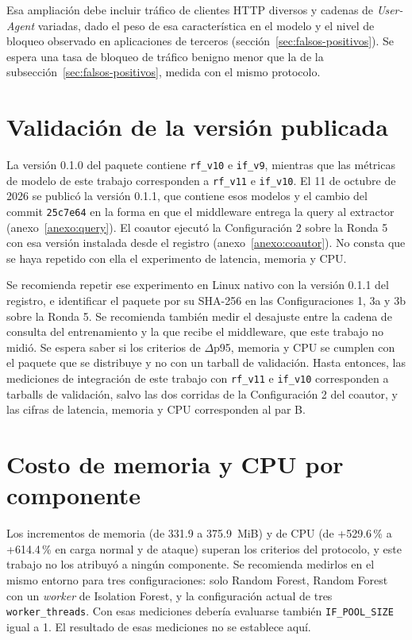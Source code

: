Esa ampliación debe incluir tráfico de clientes HTTP diversos y cadenas de \textit{User-Agent} variadas, dado el peso de esa característica en el modelo y el nivel de bloqueo observado en aplicaciones de terceros (sección~\ref{sec:falsos-positivos}). Se espera una tasa de bloqueo de tráfico benigno menor que la de la subsección~\ref{sec:falsos-positivos}, medida con el mismo protocolo.

\section{Validación de la versión publicada}

La versión 0.1.0 del paquete contiene \texttt{rf\_v10} e \texttt{if\_v9}, mientras que las métricas de modelo de este trabajo corresponden a \texttt{rf\_v11} e \texttt{if\_v10}. El 11 de octubre de 2026 se publicó la versión 0.1.1, que contiene esos modelos y el cambio del commit \texttt{25c7e64} en la forma en que el middleware entrega la query al extractor (anexo~\ref{anexo:query}). El coautor ejecutó la Configuración 2 sobre la Ronda 5 con esa versión instalada desde el registro (anexo~\ref{anexo:coautor}). No consta que se haya repetido con ella el experimento de latencia, memoria y CPU.

Se recomienda repetir ese experimento en Linux nativo con la versión 0.1.1 del registro, e identificar el paquete por su SHA-256 en las Configuraciones 1, 3a y 3b sobre la Ronda 5. Se recomienda también medir el desajuste entre la cadena de consulta del entrenamiento y la que recibe el middleware, que este trabajo no midió. Se espera saber si los criterios de $\Delta$p95, memoria y CPU se cumplen con el paquete que se distribuye y no con un tarball de validación. Hasta entonces, las mediciones de integración de este trabajo con \texttt{rf\_v11} e \texttt{if\_v10} corresponden a tarballs de validación, salvo las dos corridas de la Configuración 2 del coautor, y las cifras de latencia, memoria y CPU corresponden al par B.

\section{Costo de memoria y CPU por componente}

Los incrementos de memoria (de 331.9 a 375.9~MiB) y de CPU (de +529.6\,\% a +614.4\,\% en carga normal y de ataque) superan los criterios del protocolo, y este trabajo no los atribuyó a ningún componente. Se recomienda medirlos en el mismo entorno para tres configuraciones: solo Random Forest, Random Forest con un \textit{worker} de Isolation Forest, y la configuración actual de tres \texttt{worker\_threads}. Con esas mediciones debería evaluarse también \texttt{IF\_POOL\_SIZE} igual a 1. El resultado de esas mediciones no se establece aquí.

